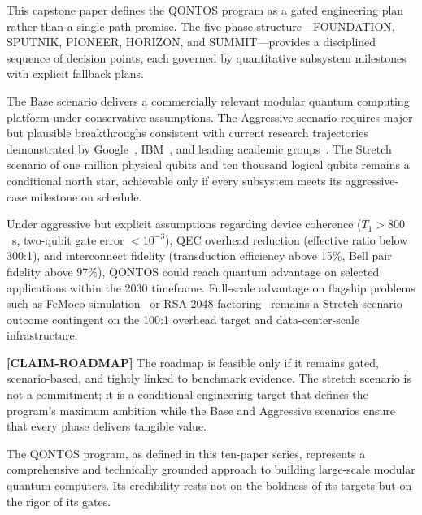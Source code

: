\documentclass[conference]{IEEEtran}
\begin{document}
This capstone paper defines the QONTOS program as a gated engineering plan rather than a single-path promise. The five-phase structure---FOUNDATION, SPUTNIK, PIONEER, HORIZON, and SUMMIT---provides a disciplined sequence of decision points, each governed by quantitative subsystem milestones with explicit fallback plans.

The Base scenario delivers a commercially relevant modular quantum computing platform under conservative assumptions. The Aggressive scenario requires major but plausible breakthroughs consistent with current research trajectories demonstrated by Google~\cite{google2024}, IBM~\cite{ibm2024}, and leading academic groups~\cite{bravyi2024,kim2023}. The Stretch scenario of one million physical qubits and ten thousand logical qubits remains a conditional north star, achievable only if every subsystem meets its aggressive-case milestone on schedule.

Under aggressive but explicit assumptions regarding device coherence ($T_1 > 800$~\textmu s, two-qubit gate error $< 10^{-3}$), QEC overhead reduction (effective ratio below 300:1), and interconnect fidelity (transduction efficiency above 15\%, Bell pair fidelity above 97\%), QONTOS could reach quantum advantage on selected applications within the 2030 timeframe. Full-scale advantage on flagship problems such as FeMoco simulation~\cite{reiher2017} or RSA-2048 factoring~\cite{gidney2021} remains a Stretch-scenario outcome contingent on the 100:1 overhead target and data-center-scale infrastructure.

\textbf{[CLAIM-ROADMAP]} The roadmap is feasible only if it remains gated, scenario-based, and tightly linked to benchmark evidence. The stretch scenario is not a commitment; it is a conditional engineering target that defines the program's maximum ambition while the Base and Aggressive scenarios ensure that every phase delivers tangible value.

The QONTOS program, as defined in this ten-paper series, represents a comprehensive and technically grounded approach to building large-scale modular quantum computers. Its credibility rests not on the boldness of its targets but on the rigor of its gates.
\end{document}
